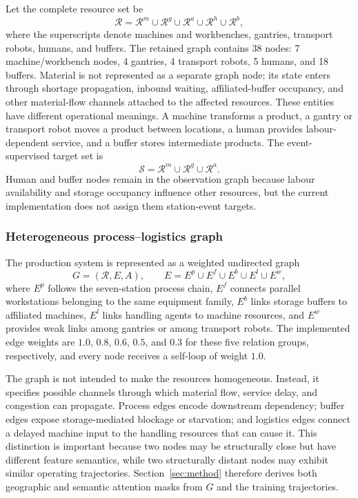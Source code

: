 \documentclass[a4paper,fleqn]{cas-dc}
\begin{document}
Let the complete resource set be
\begin{equation}
\mathcal{R}=\mathcal{R}^{m}\cup\mathcal{R}^{g}\cup
\mathcal{R}^{a}\cup\mathcal{R}^{h}\cup\mathcal{R}^{b},
\end{equation}
where the superscripts denote machines and workbenches, gantries, transport robots, humans, and buffers. The retained graph contains 38 nodes: 7 machine/workbench nodes, 4 gantries, 4 transport robots, 5 humans, and 18 buffers. Material is not represented as a separate graph node; its state enters through shortage propagation, inbound waiting, affiliated-buffer occupancy, and other material-flow channels attached to the affected resources. These entities have different operational meanings. A machine transforms a product, a gantry or transport robot moves a product between locations, a human provides labour-dependent service, and a buffer stores intermediate products. The event-supervised target set is
\begin{equation}
\mathcal{S}=\mathcal{R}^{m}\cup\mathcal{R}^{g}\cup\mathcal{R}^{a}.
\end{equation}
Human and buffer nodes remain in the observation graph because labour availability and storage occupancy influence other resources, but the current implementation does not assign them station-event targets.


\subsubsection{Heterogeneous process--logistics graph}

The production system is represented as a weighted undirected graph
\begin{equation}
G=(\mathcal{R},E,A),\qquad
E=E^{p}\cup E^{f}\cup E^{b}\cup E^{l}\cup E^{w},
\end{equation}
where $E^{p}$ follows the seven-station process chain, $E^{f}$ connects parallel workstations belonging to the same equipment family, $E^{b}$ links storage buffers to affiliated machines, $E^{l}$ links handling agents to machine resources, and $E^{w}$ provides weak links among gantries or among transport robots. The implemented edge weights are $1.0$, $0.8$, $0.6$, $0.5$, and $0.3$ for these five relation groups, respectively, and every node receives a self-loop of weight $1.0$.


The graph is not intended to make the resources homogeneous. Instead, it specifies possible channels through which material flow, service delay, and congestion can propagate. Process edges encode downstream dependency; buffer edges expose storage-mediated blockage or starvation; and logistics edges connect a delayed machine input to the handling resources that can cause it. This distinction is important because two nodes may be structurally close but have different feature semantics, while two structurally distant nodes may exhibit similar operating trajectories. Section~\ref{sec:method} therefore derives both geographic and semantic attention masks from $G$ and the training trajectories.
\end{document}

